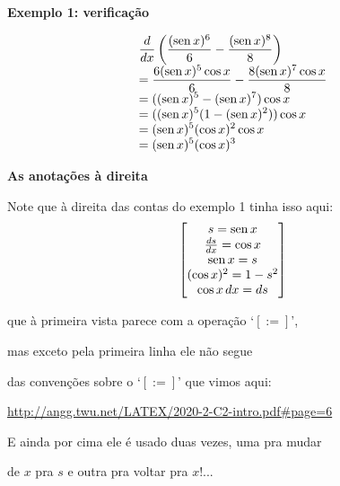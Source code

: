 \documentclass[oneside,12pt]{article}
\begin{document}
\newpage


{\bf Exemplo 1: verificação}

$$\begin{array}[t]{l}
  \displaystyle \frac{d}{dx} \left(\frac{(\operatorname{sen} x)^6}{6} - \frac{(\operatorname{sen} x)^8}{8}\right) \\
  \displaystyle = \frac{6(\operatorname{sen} x)^5\cos x}{6} - \frac{8(\operatorname{sen} x)^7\cos x}{8} \\
  \displaystyle = ((\operatorname{sen} x)^5 - (\operatorname{sen} x)^7) \cos x \\
  \displaystyle = ((\operatorname{sen} x)^5(1-(\operatorname{sen} x)^2)) \cos x \\
  \displaystyle = (\operatorname{sen} x)^5(\cos x)^2 \cos x \\
  \displaystyle = (\operatorname{sen} x)^5(\cos x)^3 \\
  \end{array}
$$

\newpage


{\bf As anotações à direita}

\ssk

Note que à direita das contas do exemplo 1 tinha isso aqui:
%
$$\left [\begin{matrix}s = \operatorname{sen} x \\
       \frac{ds}{dx} = \cos x \\
       \operatorname{sen} x = s \\
       (\cos x)^2 = 1 - s^2 \\
       \cos x \, dx = ds
  \end{matrix}\right ]
$$

que à primeira vista parece com a operação `$[:=]$',

mas exceto pela primeira linha ele não segue 

das convenções sobre o `$[:=]$' que vimos aqui:

\ssk

\url{http://angg.twu.net/LATEX/2020-2-C2-intro.pdf\#page=6}

\ssk

E ainda por cima ele é usado duas vezes, uma pra mudar

de $x$ pra $s$ e outra pra voltar pra $x$!...

\newpage

\end{document}
